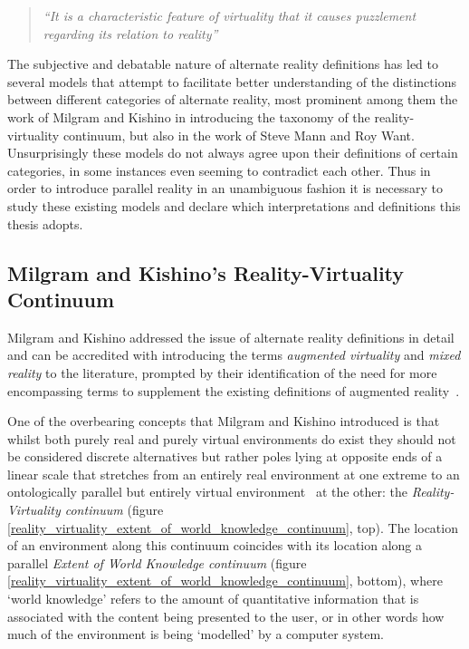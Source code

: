 \begin{quote}
	\textit{``It is a characteristic feature of virtuality that it causes puzzlement regarding its relation to reality''}~\cite{Brey2014}
\end{quote}

The subjective and debatable nature of alternate reality definitions has led to several models that attempt to facilitate better understanding of the distinctions between different categories of alternate reality, most prominent among them the work of Milgram and Kishino in introducing the taxonomy of the reality-virtuality continuum, but also in the work of Steve Mann and Roy Want. Unsurprisingly these models do not always agree upon their definitions of certain categories, in some instances even seeming to contradict each other. Thus in order to introduce parallel reality in an unambiguous fashion it is necessary to study these existing models and declare which interpretations and definitions this thesis adopts.


\subsection{Milgram and Kishino's Reality-Virtuality Continuum}
\label{background-milgram-and-kishino}
Milgram and Kishino addressed the issue of alternate reality definitions in detail and can be accredited with introducing the terms \textit{augmented virtuality} and \textit{mixed reality} to the literature, prompted by their identification of the need for more encompassing terms to supplement the existing definitions of augmented reality~\cite{Milgram1999}.


One of the overbearing concepts that Milgram and Kishino introduced is that whilst both purely real and purely virtual environments do exist they should not be considered discrete alternatives but rather poles lying at opposite ends of a linear scale that stretches from an entirely real environment at one extreme to an ontologically parallel but entirely virtual environment~\cite{Qvortrup2002} at the other: the \textit{Reality-Virtuality continuum} (figure \ref{reality_virtuality_extent_of_world_knowledge_continuum}, top). The location of an environment along this continuum coincides with its location along a parallel \textit{Extent of World Knowledge continuum} (figure \ref{reality_virtuality_extent_of_world_knowledge_continuum}, bottom), where `world knowledge' refers to the amount of quantitative information that is associated with the content being presented to the user, or in other words how much of the environment is being `modelled' by a computer system.

